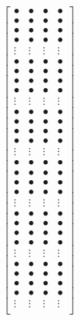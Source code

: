 \documentclass[12pt]{article}
\begin{document}
$$\begin{bmatrix}
    \bullet & \bullet & \bullet & \bullet \\
    \bullet & \bullet & \bullet & \bullet \\
    \bullet & \bullet & \bullet & \bullet \\
    \bullet & \bullet & \bullet & \bullet \\
    \vdots  & \vdots  & \vdots  & \vdots \\
    \bullet & \bullet & \bullet & \bullet \\
    \bullet & \bullet & \bullet & \bullet \\
    \bullet & \bullet & \bullet & \bullet \\
    \bullet & \bullet & \bullet & \bullet \\
    \vdots  & \vdots  & \vdots  & \vdots \\
    \bullet & \bullet & \bullet & \bullet \\
    \bullet & \bullet & \bullet & \bullet \\
    \bullet & \bullet & \bullet & \bullet \\
    \bullet & \bullet & \bullet & \bullet \\
    \vdots  & \vdots  & \vdots  & \vdots \\
    \bullet & \bullet & \bullet & \bullet \\
    \bullet & \bullet & \bullet & \bullet \\
    \bullet & \bullet & \bullet & \bullet \\
    \bullet & \bullet & \bullet & \bullet \\
    \vdots  & \vdots  & \vdots  & \vdots \\
    \bullet & \bullet & \bullet & \bullet \\
    \bullet & \bullet & \bullet & \bullet \\
    \bullet & \bullet & \bullet & \bullet \\
    \bullet & \bullet & \bullet & \bullet \\
    \vdots  & \vdots  & \vdots  & \vdots \\
    \bullet & \bullet & \bullet & \bullet \\
    \bullet & \bullet & \bullet & \bullet \\
    \bullet & \bullet & \bullet & \bullet \\
    \bullet & \bullet & \bullet & \bullet \\
    \vdots  & \vdots  & \vdots  & \vdots \\
\end{bmatrix}
$$
\end{document}
